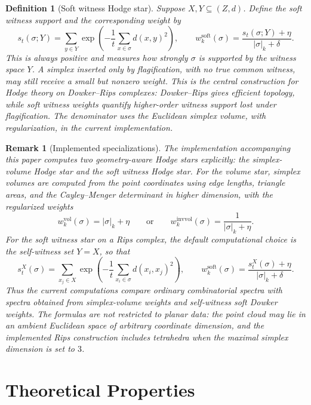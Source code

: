 \documentclass[11pt]{amsart}
\theoremstyle{plain}
\newtheorem{definition}[theorem]{Definition}
\newtheorem{remark}[theorem]{Remark}
\begin{document}
\begin{definition}[Soft witness Hodge star]
Suppose $X,Y\subseteq (Z,d)$. Define the soft witness support and the corresponding weight by
\[
s_t(\sigma;Y)=\sum_{y\in Y}\exp\!\left(-\frac{1}{t}\sum_{x\in\sigma} d(x,y)^2\right),
\qquad
w_k^{\mathrm{soft}}(\sigma)=\frac{s_t(\sigma;Y)+\eta}{|\sigma|_k+\delta}.
\]
This is always positive and measures how strongly $\sigma$ is supported by the witness space $Y$.
A simplex inserted only by flagification, with no true common witness, may still receive a small
but nonzero weight. This is the central construction for Hodge theory on Dowker--Rips complexes:
Dowker--Rips gives efficient topology, while soft witness weights quantify higher-order witness
support lost under flagification. The denominator uses the Euclidean simplex volume, with
regularization, in the current implementation.
\end{definition}

\begin{remark}[Implemented specializations]
The implementation accompanying this paper computes two geometry-aware Hodge stars explicitly:
the simplex-volume Hodge star and the soft witness Hodge star. For the volume star, simplex
volumes are computed from the point coordinates using edge lengths, triangle areas, and the
Cayley--Menger determinant in higher dimension, with the regularized weights
\[
w_k^{\mathrm{vol}}(\sigma)=|\sigma|_k+\eta
\qquad\text{or}\qquad
w_k^{\mathrm{invvol}}(\sigma)=\frac{1}{|\sigma|_k+\eta}.
\]
For the soft witness star on a Rips complex, the default computational choice is the
self-witness set $Y=X$, so that
\[
s_t^{X}(\sigma)
=
\sum_{x_j\in X}
\exp\!\left(
-\frac{1}{t}
\sum_{x_i\in\sigma}d(x_i,x_j)^2
\right),
\qquad
w_k^{\mathrm{soft}}(\sigma)
=
\frac{s_t^{X}(\sigma)+\eta}{|\sigma|_k+\delta}.
\]
Thus the current computations compare ordinary combinatorial spectra with spectra obtained from
simplex-volume weights and self-witness soft Dowker weights. The formulas are not restricted to
planar data: the point cloud may lie in an ambient Euclidean space of arbitrary coordinate
dimension, and the implemented Rips construction includes tetrahedra when the maximal simplex
dimension is set to $3$.
\end{remark}

\section{Theoretical Properties}
\label{sec:theory}
\end{document}
